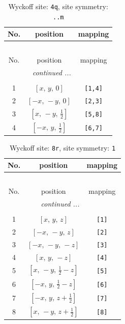 \documentclass[fleqn,8pt]{jsarticle}
\begin{document}
\renewcommand{\arraystretch}{1.2}
\begin{longtable}{ccc}
\caption{Wyckoff site: {\tt 4q}, site symmetry: {\tt ..m}}
 \\
 \hline \hline
No. & position & mapping \\ \hline \endfirsthead

\multicolumn{2}{l}{\tablename\ \thetable{}} \\
 \hline \hline
No. & position & mapping \\ \hline \endhead

 \hline \hline
\multicolumn{2}{r}{\footnotesize\it continued ...} \\ \endfoot

 \hline \hline
\multicolumn{2}{r}{} \\ \endlastfoot

1 & $\left[ x,\, y,\, 0 \right]$ & {\tt [1,4]} \\ \hline
2 & $\left[ - x,\, - y,\, 0 \right]$ & {\tt [2,3]} \\ \hline
3 & $\left[ x,\, - y,\, \frac{1}{2} \right]$ & {\tt [5,8]} \\ \hline
4 & $\left[ - x,\, y,\, \frac{1}{2} \right]$ & {\tt [6,7]} \\
\end{longtable}
\renewcommand{\arraystretch}{1.2}
\begin{longtable}{ccc}
\caption{Wyckoff site: {\tt 8r}, site symmetry: {\tt 1}}
 \\
 \hline \hline
No. & position & mapping \\ \hline \endfirsthead

\multicolumn{2}{l}{\tablename\ \thetable{}} \\
 \hline \hline
No. & position & mapping \\ \hline \endhead

 \hline \hline
\multicolumn{2}{r}{\footnotesize\it continued ...} \\ \endfoot

 \hline \hline
\multicolumn{2}{r}{} \\ \endlastfoot

1 & $\left[ x,\, y,\, z \right]$ & {\tt [1]} \\ \hline
2 & $\left[ - x,\, - y,\, z \right]$ & {\tt [2]} \\ \hline
3 & $\left[ - x,\, - y,\, - z \right]$ & {\tt [3]} \\ \hline
4 & $\left[ x,\, y,\, - z \right]$ & {\tt [4]} \\ \hline
5 & $\left[ x,\, - y,\, \frac{1}{2} - z \right]$ & {\tt [5]} \\ \hline
6 & $\left[ - x,\, y,\, \frac{1}{2} - z \right]$ & {\tt [6]} \\ \hline
7 & $\left[ - x,\, y,\, z + \frac{1}{2} \right]$ & {\tt [7]} \\ \hline
8 & $\left[ x,\, - y,\, z + \frac{1}{2} \right]$ & {\tt [8]} \\
\end{longtable}
\end{document}
